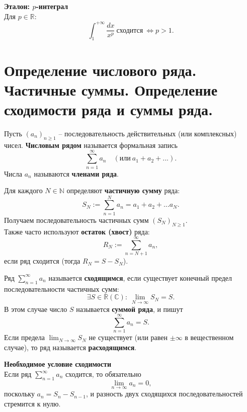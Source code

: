 \documentclass[14pt]{extreport}
\begin{document}
    \begin{theorem}
        \textbf{Эталон: $p$-интеграл}\\
        Для $p \in \mathbb{R}$:
        \[
        \int_1^{+\infty} \frac{dx}{x^p}\ \text{сходится}\ \Leftrightarrow p>1.
        \]
    \end{theorem}



    \chapter{Определение числового ряда. Частичные суммы. Определение сходимости ряда и суммы ряда.}

    \begin{definition}
        Пусть $(a_n)_{n \geq 1}$ – последовательность действительных (или комплексных) чисел. \textbf{Числовым рядом} называется формальная запись
        \[
        \sum_{n=1}^\infty a_n \quad (\text{или}\ a_1+a_2+...).
        \]
        Числа $a_n$ называются \textbf{членами ряда}.
    \end{definition}

    \begin{definition}
        Для каждого $N \in \mathbb{N}$ определяют \textbf{частичную сумму} ряда:
        \[
        S_N := \sum_{n=1}^N a_n = a_1 + a_2 + ... a_N.
        \]
        Получаем последовательность частичных сумм $(S_N)_{N \geq 1}$.\\
        Также часто используют \textbf{остаток (хвост)} ряда:
        \[
        R_N := \sum_{n=N+1}^\infty a_n,
        \]
        если ряд сходится (тогда $R_N = S - S_N$).
    \end{definition}

    \begin{definition}
        Ряд $\sum_{n=1}^\infty a_n$ называется \textbf{сходящимся}, если существует конечный предел последовательности частичных сумм:
        \[
        \exists S \in \mathbb{R} (\mathbb{C}):\ \lim_{N  \rightarrow \infty} S_N = S.
        \]
        В этом случае число $S$ называется \textbf{суммой ряда}, и пишут
        \[
        \sum_{n=1}^\infty a_n = S.
        \]
        Если предела $\lim_{N  \rightarrow \infty} S_N$ не существует (или равен $\pm \infty$ в вещественном случае), то ряд называется \textbf{расходящимся}.
    \end{definition}

    \begin{theorem}
        \textbf{Необходимое условие сходимости}\\
        Если ряд $\sum_{n=1}^\infty a_n$ сходится, то обязательно
        \[
        \lim_{n \rightarrow \infty} a_n = 0,
        \]
        поскольку $a_n = S_n - S_{n-1}$, и разность двух сходящихся последовательностей стремится к нулю.
    \end{theorem}
\end{document}
